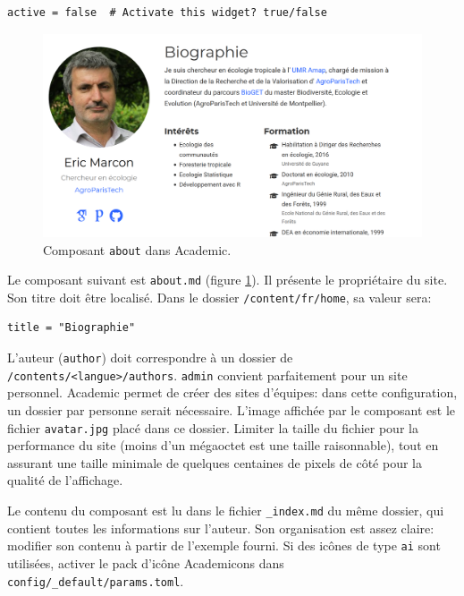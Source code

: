 \documentclass[
  12pt,
  french,
  a4paper,
  extrafontsizes,onecolumn,openright
  ]{memoir}
\newlength{\rf}
\begin{document}
\begin{verbatim}
active = false  # Activate this widget? true/false
\end{verbatim}



\scriptsize

\begin{figure}

{\centering \includegraphics[width=0.8\linewidth]{images/rediger-about} 

}

\caption{Composant \texttt{about} dans Academic.}\label{fig:rediger-about}
\end{figure}

\normalsize

Le composant suivant est \texttt{about.md} (figure \ref{fig:rediger-about}).
Il présente le propriétaire du site.
Son titre doit être localisé.
Dans le dossier \texttt{/content/fr/home}, sa valeur sera:

\begin{verbatim}
title = "Biographie"
\end{verbatim}

L'auteur (\texttt{author}) doit correspondre à un dossier de \texttt{/contents/\textless{}langue\textgreater{}/authors}.
\texttt{admin} convient parfaitement pour un site personnel.
Academic permet de créer des sites d'équipes: dans cette configuration, un dossier par personne serait nécessaire.
L'image affichée par le composant est le fichier \texttt{avatar.jpg} placé dans ce dossier.
Limiter la taille du fichier pour la performance du site (moins d'un mégaoctet est une taille raisonnable), tout en assurant une taille minimale de quelques centaines de pixels de côté pour la qualité de l'affichage.

Le contenu du composant est lu dans le fichier \texttt{\_index.md} du même dossier, qui contient toutes les informations sur l'auteur.
Son organisation est assez claire: modifier son contenu à partir de l'exemple fourni.
Si des icônes de type \texttt{ai} sont utilisées, activer le pack d'icône Academicons dans \texttt{config/\_default/params.toml}.
\end{document}
